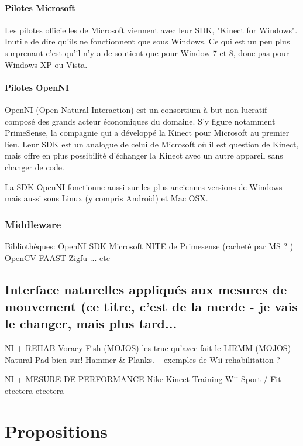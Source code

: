 \documentclass[french,12pt]{report}
\begin{document}
  \subsubsection{Pilotes Microsoft}  
  Les pilotes officielles de Microsoft viennent avec leur SDK, "Kinect for 
  Windows". Inutile de dire
  qu'ils ne fonctionnent que sous Windows. Ce qui est un peu plus surprenant 
  c'est qu'il n'y a de soutient que pour Window 7 et 8, donc pas pour Windows XP 
  ou Vista.
  \subsubsection{Pilotes OpenNI}
	OpenNI (Open Natural Interaction) est un consortium à but non lucratif composé
	des grands acteur économiques du domaine. S'y figure notamment PrimeSense, la 
	compagnie qui a développé la Kinect pour Microsoft au premier lieu. Leur SDK
	est un analogue de celui de Microsoft où il est question de Kinect, mais 
	offre en plus possibilité d'échanger la Kinect avec un autre appareil sans
	changer de code.
	
	La SDK OpenNI fonctionne aussi sur les plus anciennes versions de Windows mais
	aussi sous Linux (y compris Android) et Mac OSX.
	
	\subsection{Middleware}
  
		
		Bibliothèques:
		OpenNI
		SDK Microsoft
		NITE de Primesense (racheté par MS ? )
		OpenCV
		FAAST
		Zigfu
		... etc
		
		
		\section{Interface naturelles appliqués aux mesures de mouvement 
		(ce titre, c'est de la merde - je vais le changer, mais plus tard...}

		NI + REHAB
		Voracy Fish (MOJOS)
		les truc qu'avec fait le LIRMM (MOJOS)
 		Natural Pad bien sur! Hammer \& Planks.
		-- exemples de Wii rehabilitation ?
		
		NI + MESURE DE PERFORMANCE
		Nike Kinect Training
		Wii Sport / Fit
		etcetera etcetera
		
		
	\chapter{Propositions}
	
	
	
\end{document}

